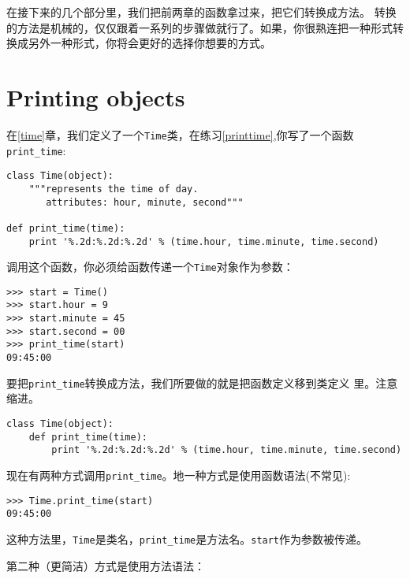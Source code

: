 在接下来的几个部分里，我们把前两章的函数拿过来，把它们转换成方法。
转换的方法是机械的，仅仅跟着一系列的步骤做就行了。如果，你很熟连把一种形式转换成另外一种形式，你将会更好的选择你想要的方式。

\section{Printing objects}
\label{print_time}


在\ref{time}章，我们定义了一个{\tt Time}类，在练习\ref{printtime},你写了一个函数\verb"print_time":

\beforeverb
\begin{verbatim}
class Time(object):
    """represents the time of day.
       attributes: hour, minute, second"""

def print_time(time):
    print '%.2d:%.2d:%.2d' % (time.hour, time.minute, time.second)
\end{verbatim}
\afterverb

调用这个函数，你必须给函数传递一个{\tt Time}对象作为参数：

\beforeverb
\begin{verbatim}
>>> start = Time()
>>> start.hour = 9
>>> start.minute = 45
>>> start.second = 00
>>> print_time(start)
09:45:00
\end{verbatim}
\afterverb

要把\verb"print_time"转换成方法，我们所要做的就是把函数定义移到类定义
里。注意缩进。


\beforeverb
\begin{verbatim}
class Time(object):
    def print_time(time):
        print '%.2d:%.2d:%.2d' % (time.hour, time.minute, time.second)
\end{verbatim}
\afterverb

现在有两种方式调用\verb"print_time"。地一种方式是使用函数语法(不常见):


\beforeverb
\begin{verbatim}
>>> Time.print_time(start)
09:45:00
\end{verbatim}
\afterverb

这种方法里，{\tt Time}是类名，\verb"print_time"是方法名。{\tt start}作为参数被传递。

第二种（更简洁）方式是使用方法语法：


